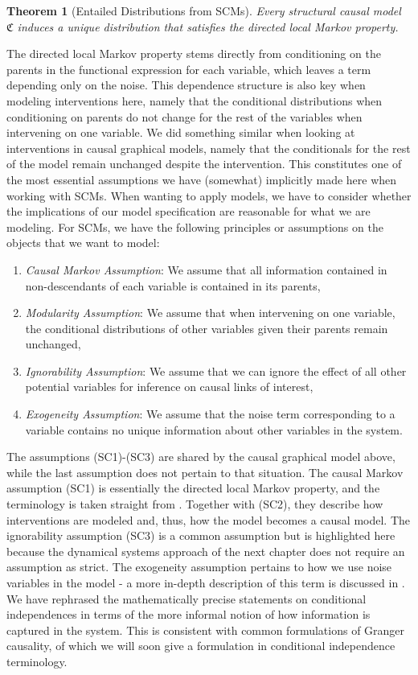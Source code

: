 \documentclass[11pt, a4paper]{memoir}
\theoremstyle{break}
\newtheorem{thm}{Theorem}
\theoremstyle{break}
\theoremstyle{nonumberplain}
\begin{document}
\begin{thm}[Entailed Distributions from SCMs]\label{entail}
Every structural causal model $\mathfrak{C}$ induces a unique distribution that satisfies the directed local Markov property.
\end{thm}
The directed local Markov property stems directly from conditioning on the parents in the functional expression for each variable, which leaves a term depending only on the noise. This dependence structure is also key when modeling interventions here, namely that the conditional distributions when conditioning on parents do not change for the rest of the variables when intervening on one variable. We did something similar when looking at interventions in causal graphical models, namely that the conditionals for the rest of the model remain unchanged despite the intervention. This constitutes one of the most essential assumptions we have (somewhat) implicitly made here when working with SCMs. When wanting to apply models, we have to consider whether the implications of our model specification are reasonable for what we are modeling. For SCMs, we have the following principles or assumptions on the objects that we want to model:
\begin{enumerate}[itemindent=15pt,label=(SC\arabic*)]
	\item \emph{Causal Markov Assumption}: We assume that all information contained in non-descendants of each variable is contained in its parents,
	\item \emph{Modularity Assumption}: We assume that when intervening on one variable, the conditional distributions of other variables given their parents remain unchanged,
	\item \emph{Ignorability Assumption}: We assume that we can ignore the effect of all other potential variables for inference on causal links of interest,
	\item \emph{Exogeneity Assumption}: We assume that the noise term corresponding to a variable contains no unique information about other variables in the system.
\end{enumerate}
The assumptions (SC1)-(SC3) are shared by the causal graphical model above, while the last assumption does not pertain to that situation. The causal Markov assumption (SC1) is essentially the directed local Markov property, and the terminology is taken straight from \cite{Spirtes}. Together with (SC2), they describe how interventions are modeled and, thus, how the model becomes a causal model. The ignorability assumption (SC3) is a common assumption but is highlighted here because the dynamical systems approach of the next chapter does not require an assumption as strict. The exogeneity assumption pertains to how we use noise variables in the model - a more in-depth description of this term is discussed in \cite{Engle}. We have rephrased the mathematically precise statements on conditional independences in terms of the more informal notion of how information is captured in the system. This is consistent with common formulations of Granger causality, of which we will soon give a formulation in conditional independence terminology.\\\\
\end{document}
